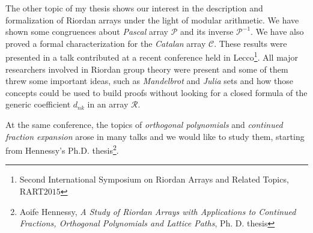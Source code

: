  The other topic of
my thesis shows our interest in the description and formalization of Riordan
arrays under the light of modular arithmetic. We have shown some congruences
about \emph{Pascal} array $\mathcal{P}$ and its inverse $\mathcal{P}^{-1}$. We
have also proved a formal characterization for the \emph{Catalan} array
$\mathcal{C}$. These results were presented in a talk contributed at a recent
conference held in Lecco\footnote{Second International Symposium on Riordan
Arrays and Related Topics, RART$2015$}. All major researchers involved in Riordan group
theory were present and some of them threw some important ideas, such as
\emph{Mandelbrot} and \emph{Julia} sets and how those concepts could be used to
build proofs without looking for a closed formula of the generic coefficient
$d_{nk}$ in an array $\mathcal{R}$.  

At the same conference, the topics of \emph{orthogonal polynomials} and
\emph{continued fraction expansion} arose in many talks and we would like to
study them, starting from Hennessy's Ph.D. thesis\footnote{Aoife Hennessy, \emph{A Study of
Riordan Arrays with Applications to Continued Fractions, Orthogonal Polynomials
and Lattice Paths}, Ph.  D.  thesis}.

